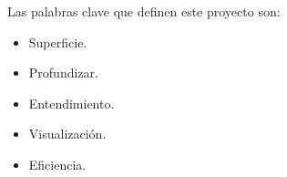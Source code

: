 \newpage
Las palabras clave que definen este proyecto son:
\begin{itemize}
	\item Superficie.
	\item Profundizar.
	\item Entendimiento.
	\item Visualización.
	\item Eficiencia.
\end{itemize}

\endinput
